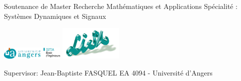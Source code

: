 



\begin{frame}
	\center Soutenance de Master Recherche Mathématiques et Applications
	\center Spécialité : Systèmes Dynamiques et Signaux\vspace{2em}
	\titlepage
	\thispagestyle{empty}
	\begin{center}
	\end{center}
		\includegraphics[trim= 0mm 0mm 0mm 0mm, clip, width=3cm]{image/logo_univ_angers}\hspace{13em}
		\includegraphics[width=3cm]{image/lisa}

		\tiny	Supervisor: Jean-Baptiste FASQUEL \hspace{19em}	EA 4094 - Université d’Angers

\end{frame}


